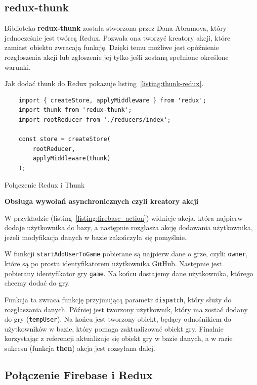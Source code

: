 \subsection{redux-thunk}

Biblioteka \textbf{redux-thunk} została stworzona przez Dana Abramova,
który jednocześnie jest twórcą Redux. Pozwala ona tworzyć kreatory akcji,
które zamiast obiektu zwracają funkcję.
Dzięki temu możliwe jest opóźnienie rozgłoszenia akcji lub zgłoszenie jej tylko
jeśli zostaną spełnione określone warunki.~\cite{www_thunk}

Jak dodać thunk do Redux pokazuje listing~\ref{listing:thunk-redux}.

\begin{listing}
\begin{verbatim}
    import { createStore, applyMiddleware } from 'redux';
    import thunk from 'redux-thunk';
    import rootReducer from './reducers/index';

    const store = createStore(
        rootReducer,
        applyMiddleware(thunk)
    );
\end{verbatim}
\caption{Połączenie Redux i Thunk} \label{listing:thunk-redux}
\end{listing}

\begin{center}
	\textbf{Obsługa wywołań asynchronicznych czyli kreatory akcji}
\end{center}

W przykładzie (listing~\ref{listing:firebase_action}) widnieje akcja,
która najpierw dodaje użytkownika do bazy, a następnie rozgłasza akcję dodawania użytkownika,
jeżeli modyfikacja danych w bazie zakończyła się pomyślnie.

W funkcji \texttt{startAddUserToGame} pobierane są najpierw dane o grze, czyli: \texttt{owner},
które są po prostu identyfikatorem użytkownika GitHub.
Następnie jest pobierany identyfikator gry \texttt{game}.
Na końcu dostajemy dane użytkownika, którego chcemy dodać do gry.

Funkcja ta zwraca funkcję przyjmującą parametr \texttt{dispatch},
który służy do rozgłaszania danych.
Później jest tworzony użytkownik, który ma zostać dodany do gry (\texttt{tempUser}).
Na końcu jest tworzony obiekt, będący odnośnikiem do użytkowników w bazie,
który pomaga zaktualizować obiekt gry.
Finalnie korzystając z referencji aktualizuje się obiekt gry w bazie danych,
a w razie sukcesu (funkcja \textbf{then}) akcja jest rozsyłana dalej.

\subsection{Połączenie Firebase i Redux}

